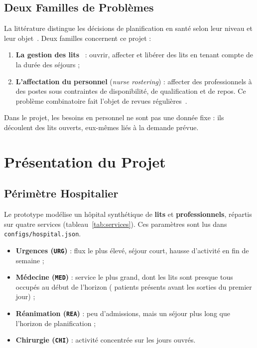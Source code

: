 \subsection{Deux Familles de Problèmes}
La littérature distingue les décisions de planification en santé selon leur niveau et leur objet~\cite{hulshof2012}. Deux familles concernent ce projet :
\begin{enumerate}
    \item \textbf{La gestion des lits}~\cite{hallbeds} : ouvrir, affecter et libérer des lits en tenant compte de la durée des séjours ;
    \item \textbf{L'affectation du personnel} (\emph{nurse rostering}) : affecter des professionnels à des postes sous contraintes de disponibilité, de qualification et de repos. Ce problème combinatoire fait l'objet de revues régulières~\cite{burke2004,koukaras2026}.
\end{enumerate}

Dans le projet, les besoins en personnel ne sont pas une donnée fixe : ils découlent des lits ouverts, eux-mêmes liés à la demande prévue.

\section{Présentation du Projet}

\subsection{Périmètre Hospitalier}
Le prototype modélise un hôpital synthétique de \textbf{\NbLits{} lits} et \textbf{\NbAgents{} professionnels}, répartis sur quatre services (tableau~\ref{tab:services}). Ces paramètres sont lus dans \texttt{configs/hospital.json}.



\begin{itemize}
    \item \textbf{Urgences (\texttt{URG})} : flux le plus élevé, séjour court, hausse d'activité en fin de semaine ;
    \item \textbf{Médecine (\texttt{MED})} : service le plus grand, dont les lits sont presque tous occupés au début de l'horizon (\RecensementMed{} patients présents avant les sorties du premier jour) ;
    \item \textbf{Réanimation (\texttt{REA})} : peu d'admissions, mais un séjour plus long que l'horizon de planification ;
    \item \textbf{Chirurgie (\texttt{CHI})} : activité concentrée sur les jours ouvrés.
\end{itemize}

